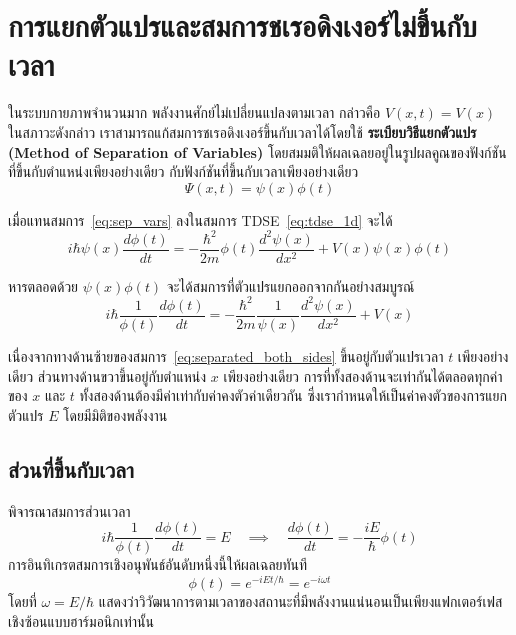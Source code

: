 \section{การแยกตัวแปรและสมการชเรอดิงเงอร์ไม่ขึ้นกับเวลา}

ในระบบกายภาพจำนวนมาก พลังงานศักย์ไม่เปลี่ยนแปลงตามเวลา กล่าวคือ $V(x, t) = V(x)$ ในสภาวะดังกล่าว เราสามารถแก้สมการชเรอดิงเงอร์ขึ้นกับเวลาได้โดยใช้ \textbf{ระเบียบวิธีแยกตัวแปร (Method of Separation of Variables)} โดยสมมติให้ผลเฉลยอยู่ในรูปผลคูณของฟังก์ชันที่ขึ้นกับตำแหน่งเพียงอย่างเดียว กับฟังก์ชันที่ขึ้นกับเวลาเพียงอย่างเดียว
\begin{equation}
\Psi(x, t) = \psi(x) \phi(t)
\label{eq:sep_vars}
\end{equation}

เมื่อแทนสมการ~\eqref{eq:sep_vars} ลงในสมการ TDSE~\eqref{eq:tdse_1d} จะได้
\begin{equation}
i\hbar \psi(x) \frac{d\phi(t)}{dt} = -\frac{\hbar^2}{2m} \phi(t) \frac{d^2\psi(x)}{dx^2} + V(x) \psi(x) \phi(t)
\end{equation}

หารตลอดด้วย $\psi(x)\phi(t)$ จะได้สมการที่ตัวแปรแยกออกจากกันอย่างสมบูรณ์
\begin{equation}
i\hbar \frac{1}{\phi(t)} \frac{d\phi(t)}{dt} = -\frac{\hbar^2}{2m} \frac{1}{\psi(x)} \frac{d^2\psi(x)}{dx^2} + V(x)
\label{eq:separated_both_sides}
\end{equation}

เนื่องจากทางด้านซ้ายของสมการ~\eqref{eq:separated_both_sides} ขึ้นอยู่กับตัวแปรเวลา $t$ เพียงอย่างเดียว ส่วนทางด้านขวาขึ้นอยู่กับตำแหน่ง $x$ เพียงอย่างเดียว การที่ทั้งสองด้านจะเท่ากันได้ตลอดทุกค่าของ $x$ และ $t$ ทั้งสองด้านต้องมีค่าเท่ากับค่าคงตัวค่าเดียวกัน ซึ่งเรากำหนดให้เป็นค่าคงตัวของการแยกตัวแปร $E$ โดยมีมิติของพลังงาน

\subsection{ส่วนที่ขึ้นกับเวลา}
พิจารณาสมการส่วนเวลา
\begin{equation}
i\hbar \frac{1}{\phi(t)} \frac{d\phi(t)}{dt} = E \quad \implies \quad \frac{d\phi(t)}{dt} = -\frac{iE}{\hbar} \phi(t)
\end{equation}
การอินทิเกรตสมการเชิงอนุพันธ์อันดับหนึ่งนี้ให้ผลเฉลยทันที
\begin{equation}
\phi(t) = e^{-iEt/\hbar} = e^{-i\omega t}
\label{eq:time_part_sol}
\end{equation}
โดยที่ $\omega = E/\hbar$ แสดงว่าวิวัฒนาการตามเวลาของสถานะที่มีพลังงานแน่นอนเป็นเพียงแฟกเตอร์เฟสเชิงซ้อนแบบฮาร์มอนิกเท่านั้น

